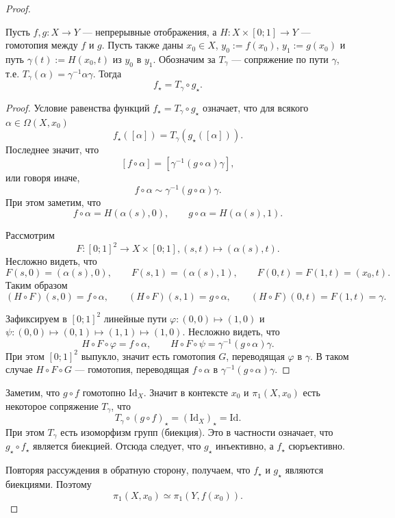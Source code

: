 \documentclass[12pt,a4paper]{article}
\newcommand{\Id}{\ensuremath{\mathrm{Id}}\xspace}
\begin{document}
    \begin{proof}
        \begin{thlemma}
            Пусть $f, g: X \to Y$ --- непрерывные отображения, а $H: X \times [0; 1] \to Y$ --- гомотопия между $f$ и $g$. Пусть также даны $x_0 \in X$, $y_0 := f(x_0)$, $y_1 := g(x_0)$ и путь $\gamma(t) := H(x_0, t)$ из $y_0$ в $y_1$. Обозначим за $T_\gamma$ --- сопряжение по пути $\gamma$, т.е. $T_\gamma(\alpha) = \gamma^{-1} \alpha \gamma$. Тогда
            \[f_\star = T_\gamma \circ g_\star.\]
        \end{thlemma}

        \begin{proof}
            Условие равенства функций $f_\star = T_\gamma \circ g_\star$ означает, что для всякого $\alpha \in \Omega(X, x_0)$
            \[f_\star([\alpha]) = T_\gamma(g_\star([\alpha])).\]
            Последнее значит, что
            \[[f \circ \alpha] = [\gamma^{-1} (g \circ \alpha) \gamma],\]
            или говоря иначе,
            \[f \circ \alpha \sim \gamma^{-1} (g \circ \alpha) \gamma.\]
            При этом заметим, что
            \[f \circ \alpha = H(\alpha(s), 0), \qquad g \circ \alpha = H(\alpha(s), 1).\]

            Рассмотрим
            \[F: [0; 1]^2 \to X \times [0; 1], (s, t) \mapsto (\alpha(s), t).\]
            Несложно видеть, что
            \[
                F(s, 0) = (\alpha(s), 0),
                \qquad
                F(s, 1) = (\alpha(s), 1),
                \qquad
                F(0, t) = F(1, t) = (x_0, t).
            \]
            Таким образом
            \[
                (H \circ F)(s, 0) = f \circ \alpha,
                \qquad
                (H \circ F)(s, 1) = g \circ \alpha,
                \qquad
                (H \circ F)(0, t) = F(1, t) = \gamma.
            \]
            
            Зафиксируем в $[0; 1]^2$ линейные пути $\varphi: (0, 0) \mapsto (1, 0)$ и $\psi: (0, 0) \mapsto (0, 1) \mapsto (1, 1) \mapsto (1, 0)$. Несложно видеть, что
            \[H \circ F \circ \varphi = f \circ \alpha, \qquad H \circ F \circ \psi = \gamma^{-1} (g \circ \alpha) \gamma.\]
            При этом $[0; 1]^2$ выпукло, значит есть гомотопия $G$, переводящая $\varphi$ в $\gamma$. В таком случае $H \circ F \circ G$ --- гомотопия, переводящая $f \circ \alpha$ в $\gamma^{-1} (g \circ \alpha) \gamma$.
        \end{proof}

        Заметим, что $g \circ f$ гомотопно $\Id_X$. Значит в контексте $x_0$ и $\pi_1(X, x_0)$ есть некоторое сопряжение $T_\gamma$, что
        \[T_\gamma \circ (g \circ f)_\star = (\Id_X)_\star = \Id.\]
        При этом $T_\gamma$ есть изоморфизм групп (биекция). Это в частности означает, что $g_\star \circ f_\star$ является биекцией. Отсюда следует, что $g_\star$ инъективно, а $f_\star$ сюръективно.

        Повторяя рассуждения в обратную сторону, получаем, что $f_\star$ и $g_\star$ являются биекциями. Поэтому
        \[\pi_1(X, x_0) \simeq \pi_1(Y, f(x_0)).\]
    \end{proof}
\end{document}
